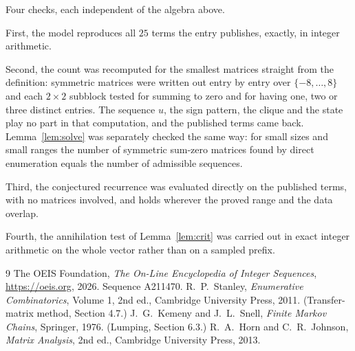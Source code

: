 \documentclass[11pt,a4paper]{article}
\theoremstyle{plain}
\theoremstyle{definition}
\begin{document}
Four checks, each independent of the algebra above.

First, the model reproduces all $25$ terms the entry publishes, exactly, in integer
arithmetic.

Second, the count was recomputed for the smallest matrices straight from the definition:
symmetric matrices were written out entry by entry over $\{-8,\dots,8\}$ and each
$2\times2$ subblock tested for summing to zero and for having one, two or three distinct entries. The
sequence $u$, the sign pattern, the clique and the state play no part in that computation, and
the published terms came back. Lemma~\ref{lem:solve} was separately checked the same way: for
small sizes and small ranges the number of symmetric sum-zero matrices found by direct
enumeration equals the number of admissible sequences.

Third, the conjectured recurrence was evaluated directly on the published terms, with no
matrices involved, and holds wherever the proved range and the data overlap.

Fourth, the annihilation test of Lemma~\ref{lem:crit} was carried out in exact integer
arithmetic on the whole vector rather than on a sampled prefix.

\begin{thebibliography}{9}
 The OEIS Foundation, \emph{The On-Line Encyclopedia of Integer
Sequences}, \url{https://oeis.org}, 2026. Sequence A211470.
 R.~P.~Stanley, \emph{Enumerative Combinatorics}, Volume 1, 2nd ed.,
Cambridge University Press, 2011. (Transfer-matrix method, Section 4.7.)
 J.~G.~Kemeny and J.~L.~Snell, \emph{Finite Markov Chains}, Springer, 1976.
(Lumping, Section 6.3.)
 R.~A.~Horn and C.~R.~Johnson, \emph{Matrix Analysis}, 2nd ed., Cambridge
University Press, 2013.
\end{thebibliography}
\end{document}
